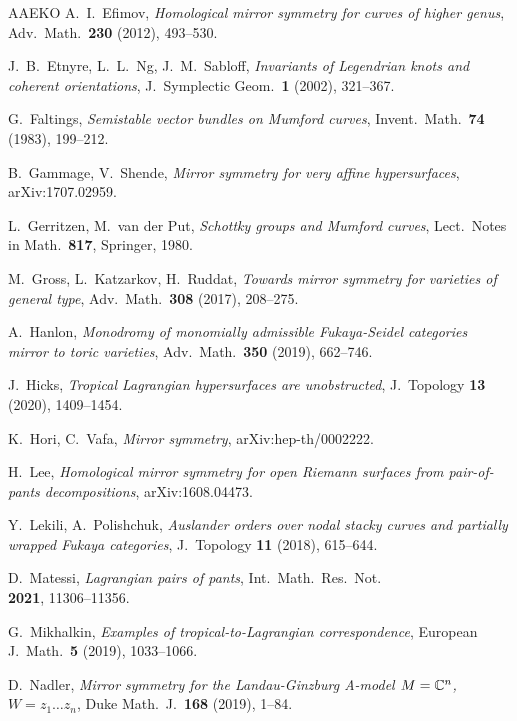 \begin{thebibliography}{AAEKO}
   A.~I.~Efimov, {\sl Homological mirror symmetry for curves of higher genus},
   Adv.\ Math.\ {\bf 230} (2012), 493--530.

   J.~B.~Etnyre, L.~L.~Ng, J.~M.~Sabloff,
   {\sl Invariants of Legendrian knots and coherent orientations},
   J.\ Symplectic Geom.\ {\bf 1} (2002), 321--367.

   G.~Faltings,
   {\sl Semistable vector bundles on Mumford curves},
   Invent.\ Math.\ {\bf 74} (1983), 199--212.

   B.~Gammage, V.~Shende,
   {\sl Mirror symmetry for very affine hypersurfaces},
   arXiv:1707.02959.

   L.\ Gerritzen, M.\ van der Put,
   {\it Schottky groups and Mumford curves},
   Lect.\ Notes in Math.\ {\bf 817}, Springer, 1980.

   M.~Gross, L.~Katzarkov, H.~Ruddat,
   {\sl Towards mirror symmetry for varieties of general type},
   Adv.\ Math.\ {\bf 308} (2017), 208--275.

   A.~Hanlon, {\sl Monodromy of monomially admissible Fukaya-Seidel categories mirror to toric
   varieties}, Adv.\ Math.\ {\bf 350} (2019), 662--746.

   J.~Hicks, {\sl Tropical Lagrangian hypersurfaces are unobstructed},
   J.\ Topology {\bf 13} (2020), 1409--1454.

   K.~Hori, C.~Vafa, {\sl Mirror symmetry},
   arXiv:hep-th/0002222.

   H.~Lee,
   {\sl Homological mirror symmetry for open Riemann surfaces from pair-of-pants decompositions},
   arXiv:1608.04473.

   Y.~Lekili, A.~Polishchuk,
   {\sl Auslander orders over nodal stacky curves and partially wrapped Fukaya categories},
   J.\ Topology {\bf 11} (2018), 615--644.

   D.~Matessi, {\sl Lagrangian pairs of pants}, Int.\ Math.\ Res.\ Not.\\
   {\bf 2021}, 11306--11356.

   G.~Mikhalkin, {\sl Examples of tropical-to-Lagrangian correspondence},
   European J.\ Math.\ {\bf 5} (2019), 1033--1066.

   D.~Nadler,
   {\sl Mirror symmetry for the Landau-Ginzburg A-model $M=\mathbb{C}^n$, $W=z_1\dots z_n$},
   Duke Math.\ J.\ {\bf 168} (2019), 1--84.


\end{thebibliography}
